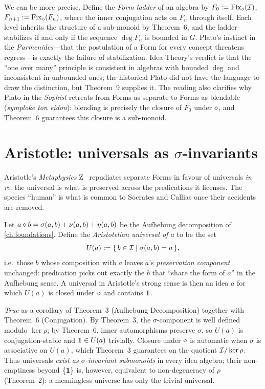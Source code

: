 We can be more precise. Define the \emph{Form ladder} of an algebra by
$F_0 \mathrel{:=} \mathrm{Fix}_{\mathbin{\diamond}}(\mathcal{I})$, $F_{n+1}\mathrel{:=}
\mathrm{Fix}_{\mathbin{\diamond}}(F_n)$, where the inner conjugation acts on $F_n$
through itself. Each level inherits the structure of a sub-monoid by
Theorem~6, and the ladder stabilizes if and only if the sequence
$\deg F_n$ is bounded in $G$. Plato's instinct in the
\emph{Parmenides}---that the postulation of a Form for every concept
threatens regress---is exactly the failure of stabilization. Idea
Theory's verdict is that the ``one over many'' principle is consistent
in algebras with bounded $\deg$ and inconsistent in unbounded ones; the
historical Plato did not have the language to draw the distinction, but
Theorem~9 supplies it. The reading also clarifies why Plato in the
\emph{Sophist} retreats from Forms-as-separate to Forms-as-blendable
(\emph{symploke ton eidon}): blending is precisely the closure of $F_0$
under $\mathbin{\diamond}$, and Theorem~6 guarantees this closure is a
sub-monoid.

\section{Aristotle: universals as $\sigma$-invariants}\label{sec:aristotle}

 Aristotle's \emph{Metaphysics}
$\mathrm{Z}$~\cite{AristotleMetaphysics} repudiates separate Forms in
favour of universals \emph{in re}: the universal is what is preserved
across the predications it licenses. The species ``human'' is what is
common to Socrates and Callias once their accidents are removed.

\formalclaim Let $a\mathbin{\diamond} b=\sigma(a,b)+\nu(a,b)+\eta(a,b)$ be the
Aufhebung decomposition of \cref{ch:foundations}. Define the \emph{Aristotelian
universal of $a$} to be the set
\[
  U(a) \mathrel{:=} \{\,b\in\mathcal{I} \mid \sigma(a,b)=a\,\},
\]
i.e.\ those $b$ whose composition with $a$ leaves $a$'s
\emph{preservation component} unchanged: predication picks out exactly
the $b$ that ``share the form of $a$'' in the Aufhebung sense. A
universal in Aristotle's strong sense is then an idea $a$ for which $U(a)$
is closed under $\mathbin{\diamond}$ and contains $\mathbf{1}$.

\formalstatus \emph{True} as a corollary of Theorem~3 (Aufhebung
Decomposition) together with Theorem~6 (Conjugation). By Theorem~3, the
$\sigma$-component is well defined modulo $\ker\rho$; by Theorem~6, inner
automorphisms preserve $\sigma$, so $U(a)$ is conjugation-stable and
$\mathbf{1}\in U(a)$ trivially. Closure under $\mathbin{\diamond}$ is automatic when
$\sigma$ is associative on $U(a)$, which Theorem~3 guarantees on the
quotient $\mathcal{I}/\ker\rho$. Thus universals \emph{exist as
$\sigma$-invariant submonoids} in every idea algebra; their non-emptiness
beyond $\{\mathbf{1}\}$ is, however, equivalent to non-degeneracy of $\rho$
(Theorem~2): a meaningless universe has only the trivial universal.

